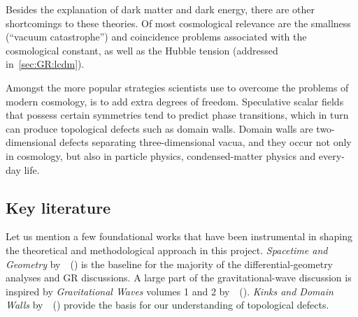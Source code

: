 Besides the explanation of dark matter and dark energy, there are other shortcomings to these theories. %
Of most cosmological relevance are the smallness (``vacuum catastrophe'') and coincidence problems associated with the cosmological constant, as well as the Hubble tension (addressed in~\cref{sec:GR:lcdm}). %


 
Amongst the more popular strategies scientists use to overcome the problems of modern cosmology, is to add extra degrees of freedom. Speculative scalar fields that possess certain symmetries tend to predict phase transitions, which in turn can produce topological defects such as domain walls. 
Domain walls are two-dimensional defects separating three-dimensional vacua, and they occur not only in cosmology, but also in particle physics, condensed-matter physics and every-day life. 










%







\subsection{Key literature}
    Let us mention a few foundational works that have been instrumental in shaping the theoretical and methodological approach in this project. %
    \textit{Spacetime and Geometry} by~\citeauthor{carrollSpacetimeGeometryIntroduction2019}~(\citeyear{carrollSpacetimeGeometryIntroduction2019}) is the baseline for the majority of the differential-geometry analyses and GR discussions. A large part of the gravitational-wave discussion is inspired by \textit{Gravitational Waves} volumes 1 and 2 by~\citeauthor{maggioreGravitationalWavesVol2007}~(\citeyear{maggioreGravitationalWavesVol2007,maggioreGravitationalWavesVol2018}). \textit{Kinks and Domain Walls} by~\citeauthor{vachaspatiKinksDomainWalls2006}~(\citeyear{vachaspatiKinksDomainWalls2006}) provide the basis for our understanding of topological defects.

